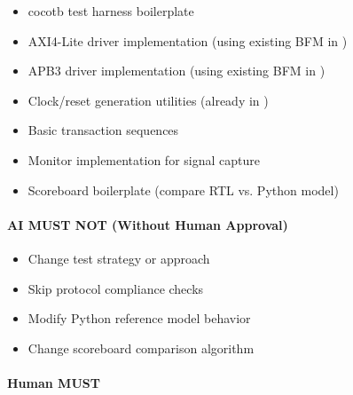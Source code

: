 \begin{record}

\begin{itemize}
\tightlist
\item
  cocotb test harness boilerplate
\item
  AXI4-Lite driver implementation (using existing BFM in
  )
\item
  APB3 driver implementation (using existing BFM in
  )
\item
  Clock/\allowbreak{}reset generation utilities (already in
  )
\item
  Basic transaction sequences
\item
  Monitor implementation for signal capture
\item
  Scoreboard boilerplate (compare RTL vs. Python model)
\end{itemize}

\end{record}

\paragraph{\texorpdfstring{\warn{} AI MUST NOT (Without Human
Approval)}{ AI MUST NOT (Without Human Approval)}}\label{cr:status:phase1-ai-human-responsibilities:warning-ai-must-not-without-human-approval-10}

\begin{record}

\begin{itemize}
\tightlist
\item
  Change test strategy or approach
\item
  Skip protocol compliance checks
\item
  Modify Python reference model behavior
\item
  Change scoreboard comparison algorithm
\end{itemize}

\end{record}

\paragraph{\texorpdfstring{\hold{} Human MUST}{ Human MUST}}\label{cr:status:phase1-ai-human-responsibilities:raised-hand-human-must-10}

